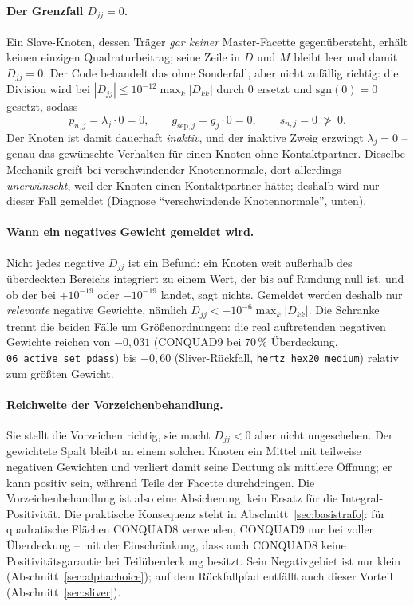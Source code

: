 \documentclass[a4paper,11pt]{article}
\def\bm#1{#1}%
\def\tilde#1{#1}%
\newcommand{\file}[1]{\texttt{\small #1}}
\begin{document}
\paragraph{Der Grenzfall $\tilde D_{jj}=0$.}
Ein Slave-Knoten, dessen Träger \emph{gar keiner} Master-Facette gegenübersteht, erhält keinen
einzigen Quadraturbeitrag; seine Zeile in $\bm D$ und $\bm M$ bleibt leer und damit
$\tilde D_{jj}=0$. Der Code behandelt das ohne Sonderfall, aber nicht zufällig richtig: die
Division wird bei $|\tilde D_{jj}|\le10^{-12}\max_k|\tilde D_{kk}|$ durch $0$ ersetzt und
$\mathrm{sgn}(0)=0$ gesetzt, sodass
\begin{equation}
p_{n,j}=\lambda_j\cdot 0=0,\qquad
g_{\text{sep},j}=\tilde g_j\cdot 0=0,\qquad
s_{n,j}=0\ \not>\ 0 .
\end{equation}
Der Knoten ist damit dauerhaft \emph{inaktiv}, und der inaktive Zweig erzwingt $\lambda_j=0$ --
genau das gewünschte Verhalten für einen Knoten ohne Kontaktpartner. Dieselbe Mechanik greift bei
verschwindender Knotennormale, dort allerdings \emph{unerwünscht}, weil der Knoten einen
Kontaktpartner hätte; deshalb wird nur dieser Fall gemeldet
(Diagnose ``verschwindende Knotennormale'', unten).

\paragraph{Wann ein negatives Gewicht gemeldet wird.}
Nicht jedes negative $\tilde D_{jj}$ ist ein Befund: ein Knoten weit außerhalb des überdeckten
Bereichs integriert zu einem Wert, der bis auf Rundung null ist, und ob der bei $+10^{-19}$ oder
$-10^{-19}$ landet, sagt nichts. Gemeldet werden deshalb nur \emph{relevante} negative Gewichte,
nämlich $\tilde D_{jj} < -10^{-6}\max_k|\tilde D_{kk}|$. Die Schranke trennt die beiden Fälle um
Größenordnungen: die real auftretenden negativen Gewichte reichen von $-0{,}031$ (CONQUAD9 bei
$70\,\%$ Überdeckung, \file{06\_active\_set\_pdass}) bis $-0{,}60$ (Sliver-Rückfall,
\file{hertz\_hex20\_medium}) relativ zum größten Gewicht.

\paragraph{Reichweite der Vorzeichenbehandlung.}
Sie stellt die Vorzeichen richtig, sie macht $\tilde D_{jj}<0$ aber nicht ungeschehen. Der
gewichtete Spalt bleibt an einem solchen Knoten ein Mittel mit teilweise negativen Gewichten und
verliert damit seine Deutung als mittlere Öffnung; er kann positiv sein, während Teile der Facette
durchdringen. Die Vorzeichenbehandlung ist also eine Absicherung, kein Ersatz für die
Integral-Positivität. Die praktische Konsequenz steht in Abschnitt~\ref{sec:basistrafo}: für
quadratische Flächen CONQUAD8 verwenden, CONQUAD9 nur bei voller Überdeckung -- mit der
Einschränkung, dass auch CONQUAD8 keine Positivitätsgarantie bei Teilüberdeckung besitzt. Sein
Negativgebiet ist nur klein (Abschnitt~\ref{sec:alphachoice}); auf dem Rückfallpfad entfällt auch
dieser Vorteil (Abschnitt~\ref{sec:sliver}).
\end{document}
